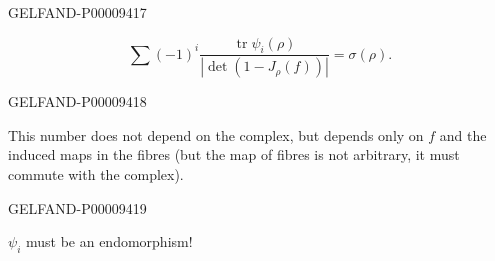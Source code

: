 \begin{GelfandAdjacentEvidence}{GELFAND-P000094}{17}

\begin{equation*}
\sum(-1)^i\frac{\operatorname{tr}\psi_i(\rho)}{|\det(1-J_\rho(f))|}
=\sigma(\rho).
\end{equation*}
\end{GelfandAdjacentEvidence}
\begin{GelfandAdjacentEvidence}{GELFAND-P000094}{18}

This number does not depend on the complex, but depends only on $f$ and the induced maps in the fibres
(but the map of fibres is not arbitrary, it must commute with the complex).
\end{GelfandAdjacentEvidence}
\begin{GelfandAdjacentEvidence}{GELFAND-P000094}{19}

$\psi_i$ must be an endomorphism!
\end{GelfandAdjacentEvidence}




